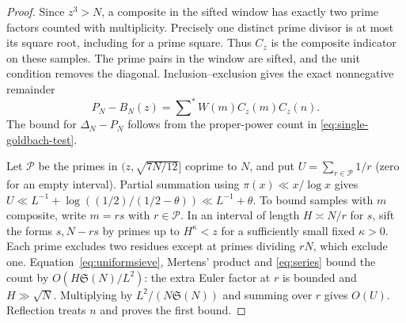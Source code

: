 \documentclass[11pt,a4paper]{article}
\numberwithin{equation}{section}
\newcommand{\SSS}{\mathfrak S}
\begin{document}
\begin{proof}
Since $z^3>N$, a composite in the sifted window has exactly two
prime factors counted with multiplicity. Precisely one distinct prime
divisor is at most its square root, including for a prime square.
Thus $C_z$ is the composite indicator on these samples. The prime
pairs in the window are sifted, and the unit condition removes the
diagonal. Inclusion--exclusion gives the exact nonnegative remainder
\[
 P_N-B_N(z)=\sum\nolimits^* W(m) C_z(m)C_z(n).
\]
The bound for $\Delta_N-P_N$ follows from the proper-power count
in \eqref{eq:single-goldbach-test}.

Let $\mathcal P$ be the primes in $(z,\sqrt{7N/12}]$ coprime to
$N$, and put $U=\sum_{r\in\mathcal P}1/r$ (zero for an empty
interval). Partial summation using $\pi(x)\ll x/\log x$ gives
$U\ll L^{-1}+\log((1/2)/(1/2-\theta))\ll L^{-1}+\theta$.
To bound samples with $m$ composite, write $m=rs$ with
$r\in\mathcal P$. In an interval of length $H\asymp N/r$ for
$s$, sift the forms $s,N-rs$ by primes up to $H^\kappa<z$ for
a sufficiently small fixed $\kappa>0$. Each prime excludes two
residues except at primes dividing $rN$, which exclude one.
Equation~\eqref{eq:uniformsieve}, Mertens' product and
\eqref{eq:series} bound the count by $O(H\SSS(N)/L^2)$:
the extra Euler factor at $r$ is bounded and $H\gg\sqrt N$.
Multiplying by $L^2/(N\SSS(N))$ and summing over $r$ gives
$O(U)$. Reflection treats $n$ and proves the first bound.


\end{proof}
\end{document}
